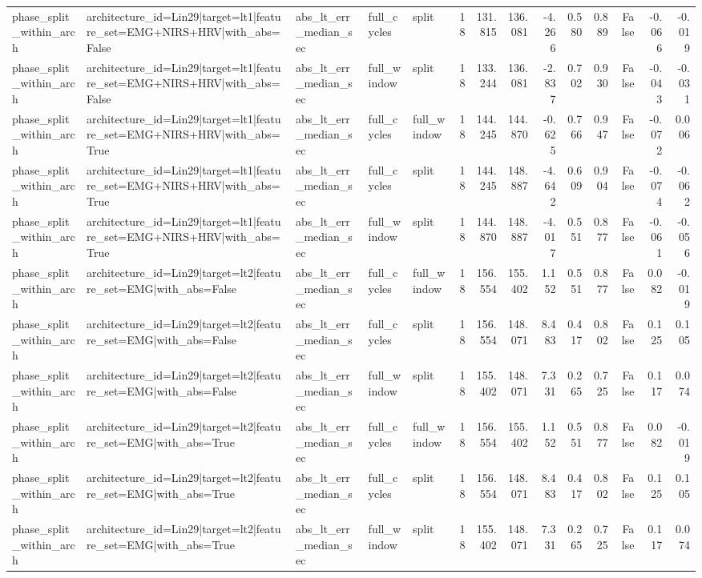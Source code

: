 \begin{table}
\begin{tabular}{lllllrrrrrrrrr}
phase_split_within_arch & architecture_id=Lin29|target=lt1|feature_set=EMG+NIRS+HRV|with_abs=False & abs_lt_err_median_sec & full_cycles & split & 18 & 131.815 & 136.081 & -4.266 & 0.580 & 0.889 & False & -0.066 & -0.019 \\
phase_split_within_arch & architecture_id=Lin29|target=lt1|feature_set=EMG+NIRS+HRV|with_abs=False & abs_lt_err_median_sec & full_window & split & 18 & 133.244 & 136.081 & -2.837 & 0.702 & 0.930 & False & -0.043 & -0.031 \\
phase_split_within_arch & architecture_id=Lin29|target=lt1|feature_set=EMG+NIRS+HRV|with_abs=True & abs_lt_err_median_sec & full_cycles & full_window & 18 & 144.245 & 144.870 & -0.625 & 0.766 & 0.947 & False & -0.072 & 0.006 \\
phase_split_within_arch & architecture_id=Lin29|target=lt1|feature_set=EMG+NIRS+HRV|with_abs=True & abs_lt_err_median_sec & full_cycles & split & 18 & 144.245 & 148.887 & -4.642 & 0.609 & 0.904 & False & -0.074 & -0.062 \\
phase_split_within_arch & architecture_id=Lin29|target=lt1|feature_set=EMG+NIRS+HRV|with_abs=True & abs_lt_err_median_sec & full_window & split & 18 & 144.870 & 148.887 & -4.017 & 0.551 & 0.877 & False & -0.061 & -0.056 \\
phase_split_within_arch & architecture_id=Lin29|target=lt2|feature_set=EMG|with_abs=False & abs_lt_err_median_sec & full_cycles & full_window & 18 & 156.554 & 155.402 & 1.152 & 0.551 & 0.877 & False & 0.082 & -0.019 \\
phase_split_within_arch & architecture_id=Lin29|target=lt2|feature_set=EMG|with_abs=False & abs_lt_err_median_sec & full_cycles & split & 18 & 156.554 & 148.071 & 8.483 & 0.417 & 0.802 & False & 0.125 & 0.105 \\
phase_split_within_arch & architecture_id=Lin29|target=lt2|feature_set=EMG|with_abs=False & abs_lt_err_median_sec & full_window & split & 18 & 155.402 & 148.071 & 7.331 & 0.265 & 0.725 & False & 0.117 & 0.074 \\
phase_split_within_arch & architecture_id=Lin29|target=lt2|feature_set=EMG|with_abs=True & abs_lt_err_median_sec & full_cycles & full_window & 18 & 156.554 & 155.402 & 1.152 & 0.551 & 0.877 & False & 0.082 & -0.019 \\
phase_split_within_arch & architecture_id=Lin29|target=lt2|feature_set=EMG|with_abs=True & abs_lt_err_median_sec & full_cycles & split & 18 & 156.554 & 148.071 & 8.483 & 0.417 & 0.802 & False & 0.125 & 0.105 \\
phase_split_within_arch & architecture_id=Lin29|target=lt2|feature_set=EMG|with_abs=True & abs_lt_err_median_sec & full_window & split & 18 & 155.402 & 148.071 & 7.331 & 0.265 & 0.725 & False & 0.117 & 0.074 \\

\end{tabular}
\end{table}
